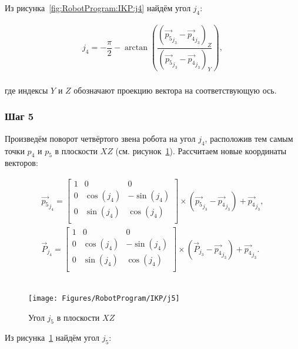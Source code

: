 Из рисунка~\ref{fig:RobotProgram:IKP:j4} найдём угол $j_4$:

\begin{gather*}
    j_4 = -\dfrac{\pi}{2} - \arctan \left( \dfrac
    {\left( \overrightarrow{p_5}_{j_3} - \overrightarrow{p_4}_{j_3} \right)_Z}
    {\left( \overrightarrow{p_5}_{j_3} - \overrightarrow{p_4}_{j_3} \right)_Y} \right),
\end{gather*} \\
где индексы $Y$ и $Z$ обозначают проекцию вектора на соответствующую ось.

\subsubsection*{Шаг 5}
Произведём поворот четвёртого звена робота на угол $j_4$, расположив тем самым точки $p_4$ и $p_5$ в плоскости $XZ$ (см. рисунок~\ref{fig:RobotProgram:IKP:j5}).
Рассчитаем новые координаты векторов:

\begin{gather*}
    \overrightarrow{p_5}_{j_4} =
    \begin{bmatrix}
        1 & 0         & 0          \\
        0 & \cos(j_4) & -\sin(j_4) \\
        0 & \sin(j_4) & \cos(j_4)  \\
    \end{bmatrix} \times \left( \overrightarrow{p_5}_{j_3} - \overrightarrow{p_4}_{j_3} \right) + \overrightarrow{p_4}_{j_3}, \\
    \overrightarrow{P}_{j_4} =
    \begin{bmatrix}
        1 & 0         & 0          \\
        0 & \cos(j_4) & -\sin(j_4) \\
        0 & \sin(j_4) & \cos(j_4)  \\
    \end{bmatrix} \times \left( \overrightarrow{P}_{j_3} - \overrightarrow{p_4}_{j_3} \right) + \overrightarrow{p_4}_{j_3}.
\end{gather*} \\


\begin{figure}[H]
    \centering
    \vspace{14pt}
    \texttt{[image: Figures/RobotProgram/IKP/j5]}
    \caption{Угол $j_5$ в плоскости $XZ$}
    \label{fig:RobotProgram:IKP:j5}
\end{figure}

Из рисунка~\ref{fig:RobotProgram:IKP:j5} найдём угол $j_5$:

